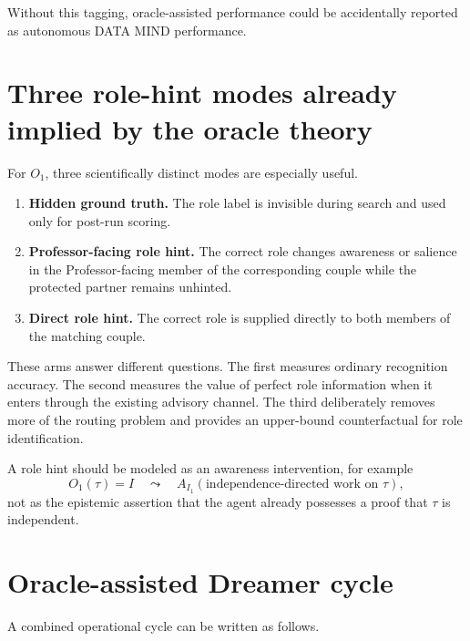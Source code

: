 Without this tagging, oracle-assisted performance could be accidentally reported as autonomous DATA MIND performance.

\section{Three role-hint modes already implied by the oracle theory}

For $O_1$, three scientifically distinct modes are especially useful.

\begin{enumerate}[leftmargin=2em]
\item \textbf{Hidden ground truth.} The role label is invisible during search and used only for post-run scoring.
\item \textbf{Professor-facing role hint.} The correct role changes awareness or salience in the Professor-facing member of the corresponding couple while the protected partner remains unhinted.
\item \textbf{Direct role hint.} The correct role is supplied directly to both members of the matching couple.
\end{enumerate}

These arms answer different questions. The first measures ordinary recognition accuracy. The second measures the value of perfect role information when it enters through the existing advisory channel. The third deliberately removes more of the routing problem and provides an upper-bound counterfactual for role identification.

A role hint should be modeled as an awareness intervention, for example
\begin{equation}
O_1(\tau)=I
\quad\leadsto\quad
A_{I_1}(\text{independence-directed work on }\tau),
\end{equation}
not as the epistemic assertion that the agent already possesses a proof that $\tau$ is independent.

\section{Oracle-assisted Dreamer cycle}

A combined operational cycle can be written as follows.

